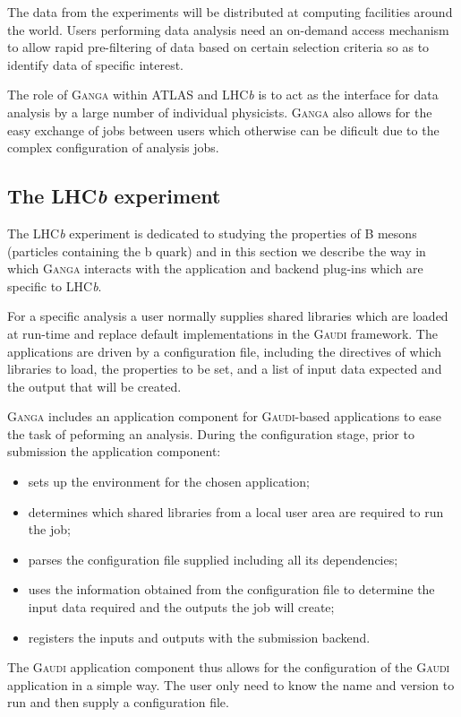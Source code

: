 \documentclass{elsart}
\def\lhcb {LHC{\em b\/}\xspace}
\def\atlas {ATLAS\xspace}
\def\ganga {\textsc{Ganga}\xspace}
\def\gaudi {\textsc{Gaudi}\xspace}
\begin{document}
The data from the experiments will be distributed at computing facilities
around the world. Users performing data analysis need an on-demand access
mechanism to allow rapid pre-filtering of data based on certain selection
criteria so as to identify data of specific interest.

The role of \ganga within \atlas and \lhcb is to act as the interface for data
analysis by a large number of individual physicists. \ganga also allows for
the easy exchange of jobs between users which otherwise can be dificult due to
the complex configuration of analysis jobs.

\subsection{The \lhcb experiment}
\label{sec:lhcb}

The \lhcb experiment is dedicated to studying the properties of B
mesons (particles containing the b quark) and in this section we
describe the way in which \ganga interacts with the application and
backend plug-ins which are specific to \lhcb.

For a specific analysis a user normally supplies shared libraries which are
loaded at run-time and replace default implementations in the \gaudi
framework.  The applications are driven by a configuration file, including the
directives of which libraries to load, the properties to be set, and a list of
input data expected and the output that will be created.

\ganga includes an application component for \gaudi-based applications to ease
the task of peforming an analysis. During the configuration stage, prior to
submission the application component:
\begin{itemize}
\item sets up the environment for the chosen application;
\item determines which shared libraries from a local user area are required to
  run the job;
\item parses the configuration file supplied including all its dependencies;
\item uses the information obtained from the configuration file to determine
  the input data required and the outputs the job will create;
\item registers the inputs and outputs with the submission backend.
\end{itemize}
The \gaudi application component thus allows for the configuration of the
\gaudi application in a simple way. The user only need to know the name and
version to run and then supply a configuration file.
\end{document}

